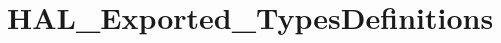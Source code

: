 \hypertarget{group___h_a_l___exported___types_definitions}{}\section{H\+A\+L\+\_\+\+Exported\+\_\+\+Types\+Definitions}
\label{group___h_a_l___exported___types_definitions}

